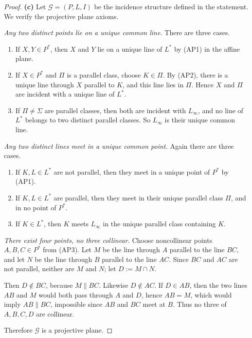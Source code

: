 \documentclass[11pt, a4paper]{ctexrep}
\begin{document}
\begin{proof}
    \medskip
    \noindent\textbf{(c)}
    Let \(\mathcal{G}=(P,L,I)\) be the incidence structure defined in the statement. We verify the
    projective plane axioms.

    \emph{Any two distinct points lie on a unique common line.}
    There are three cases.
    \begin{enumerate}
        \item If \(X,Y\in P^*\), then \(X\) and \(Y\) lie on a unique line of \(L^*\) by (AP1) in the affine plane.
        \item If \(X\in P^*\) and \(\Pi\) is a parallel class, choose \(K\in \Pi\). By (AP2), there is a unique
              line through \(X\) parallel to \(K\), and this line lies in \(\Pi\). Hence \(X\) and \(\Pi\) are incident
              with a unique line of \(L^*\).
        \item If \(\Pi\ne \Sigma\) are parallel classes, then both are incident with \(L_\infty\), and no line of
              \(L^*\) belongs to two distinct parallel classes. So \(L_\infty\) is their unique common line.
    \end{enumerate}

    \emph{Any two distinct lines meet in a unique common point.}
    Again there are three cases.
    \begin{enumerate}
        \item If \(K,L\in L^*\) are not parallel, then they meet in a unique point of \(P^*\) by (AP1).
        \item If \(K,L\in L^*\) are parallel, then they meet in their unique parallel class \(\Pi\), and in no point
              of \(P^*\).
        \item If \(K\in L^*\), then \(K\) meets \(L_\infty\) in the unique parallel class containing \(K\).
    \end{enumerate}

    \emph{There exist four points, no three collinear.}
    Choose noncollinear points \(A,B,C\in P^*\) from (AP3). Let \(M\) be the line through \(A\) parallel to
    the line \(BC\), and let \(N\) be the line through \(B\) parallel to the line \(AC\). Since \(BC\) and \(AC\)
    are not parallel, neither are \(M\) and \(N\); let \(D:=M\cap N\).

    Then \(D\notin BC\), because \(M\parallel BC\). Likewise \(D\notin AC\). If \(D\in AB\), then the two lines
    \(AB\) and \(M\) would both pass through \(A\) and \(D\), hence \(AB=M\), which would imply \(AB\parallel BC\),
    impossible since \(AB\) and \(BC\) meet at \(B\). Thus no three of \(A,B,C,D\) are collinear.

    Therefore \(\mathcal{G}\) is a projective plane.
\end{proof}
\end{document}
